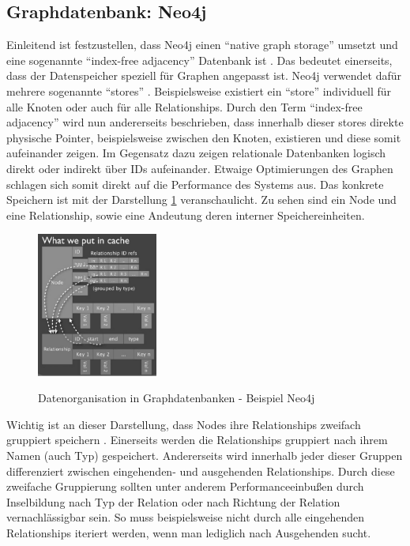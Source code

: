 \subsection{Graphdatenbank: Neo4j}
Einleitend ist festzustellen, dass Neo4j einen \enquote{native graph storage} umsetzt und eine sogenannte \enquote{index-free adjacency} Datenbank ist \cite{robinson2015graph}. Das bedeutet einerseits, dass der Datenspeicher speziell für Graphen angepasst ist. Neo4j verwendet dafür mehrere sogenannte \enquote{stores} \cite{neostores}. Beispielsweise existiert ein \enquote{store} individuell für alle Knoten oder auch für alle Relationships. Durch den Term \enquote{index-free adjacency} wird nun andererseits beschrieben, dass innerhalb dieser stores direkte physische Pointer, beispielsweise zwischen den Knoten, existieren und diese somit aufeinander zeigen. Im Gegensatz dazu zeigen relationale Datenbanken logisch direkt oder indirekt über IDs aufeinander. Etwaige Optimierungen des Graphen schlagen sich somit direkt auf die Performance des Systems aus.
\newline
Das konkrete Speichern ist mit der Darstellung \ref{fig:chapters/05-Interaktion-Abgeord/image21.png} veranschaulicht. Zu sehen sind ein Node und eine Relationship, sowie eine Andeutung deren interner Speichereinheiten.
\begin{figure}[hbt!]
    \centering
    \includegraphics[width=150px, keepaspectratio]{chapters/05-Interaktion-Abgeord/image21.png}
    \caption{Datenorganisation in Graphdatenbanken - Beispiel Neo4j} \cite{generalStorage}
    \label{fig:chapters/05-Interaktion-Abgeord/image21.png}
\end{figure}
Wichtig ist an dieser Darstellung, dass Nodes ihre Relationships zweifach gruppiert speichern \cite{neo4jrelationshipgrouping}. Einerseits werden die Relationships gruppiert nach ihrem Namen (auch Typ) gespeichert. Andererseits wird innerhalb jeder dieser Gruppen differenziert zwischen eingehenden- und ausgehenden Relationships. Durch diese zweifache Gruppierung sollten unter anderem Performanceeinbußen durch Inselbildung nach Typ der Relation oder nach Richtung der Relation vernachlässigbar sein. So muss beispielsweise nicht durch alle eingehenden Relationships iteriert werden, wenn man lediglich nach Ausgehenden sucht.
